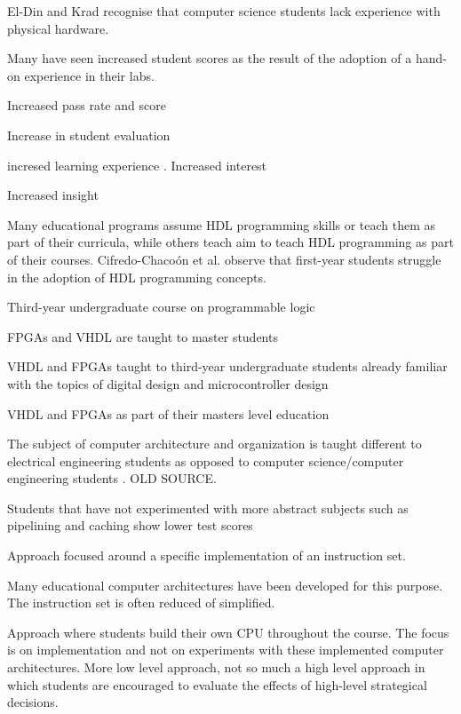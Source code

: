 \documentclass[openright]{template/uva-bachelor-thesis}
\begin{document}
El-Din and Krad \cite{el2011teaching} recognise that computer science students lack experience with physical hardware. 

Many have seen increased student scores as the result of the adoption of a hand-on experience in their labs.

Increased pass rate and score \cite{paharsingh2009novel}

Increase in student evaluation \cite{paharsingh2009novel}

incresed learning experience \cite{oztekin2011bzk}. Increased interest \cite{cifredo2015computer}

Increased insight \cite{bulic2013fpga, cifredo2015computer}


Many educational programs assume HDL programming skills \cite{jansen2014every} or teach them as part of their curricula, while others teach aim to teach HDL programming as part of their courses.  Cifredo-Chaco\'on et al.  \cite{cifredo2015computer} observe that first-year students struggle in the adoption of HDL programming concepts. 

Third-year undergraduate course on programmable logic \cite{kellett2012project}

FPGAs and VHDL are taught to master students \cite{pereira2012basic}

VHDL and FPGAs taught to third-year undergraduate students already familiar with the topics of digital design and microcontroller design \cite{kellett2012project}

VHDL and FPGAs as part of their masters level education \cite{jansen2014every, pereira2012basic}

The subject of computer architecture and organization is taught different to electrical engineering students as opposed to computer science/computer engineering students \cite{calazans2001integrating}. OLD SOURCE.

Students that have not experimented with more abstract subjects such as pipelining and caching show lower test scores \cite{paharsingh2009novel}

Approach focused around a specific implementation of an instruction set. 

Many educational computer architectures have been developed for this purpose. The instruction set is often reduced of simplified. 

Approach where students build their own CPU throughout the course. The focus is on implementation and not on experiments with these implemented computer architectures. More low level approach, not so much a high level approach in which students are encouraged to evaluate the effects of high-level strategical decisions. 
\end{document}
